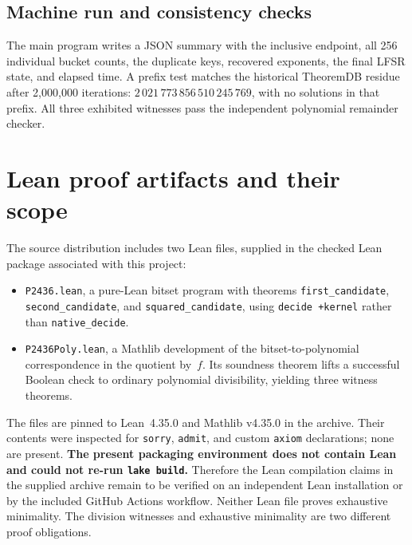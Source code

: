 \documentclass[11pt,a4paper]{article}
\begin{document}
\subsection{Machine run and consistency checks}
The main program writes a JSON summary with the inclusive endpoint,
all 256 individual bucket counts, the duplicate keys, recovered
exponents, the final LFSR state, and elapsed time. A prefix test
matches the historical TheoremDB residue after 2,000,000 iterations:
\(2\,021\,773\,856\,510\,245\,769\), with no solutions in that
prefix. All three exhibited witnesses pass the independent polynomial
remainder checker.

\section{Lean proof artifacts and their scope}
The source distribution includes two Lean files, supplied in the
checked Lean package associated with this project:
\begin{itemize}
\item \texttt{P2436.lean}, a pure-Lean bitset program with theorems
\texttt{first\_candidate}, \texttt{second\_candidate}, and
\texttt{squared\_candidate}, using \texttt{decide +kernel} rather than
\texttt{native\_decide}.
\item \texttt{P2436Poly.lean}, a Mathlib development of the
bitset-to-polynomial correspondence in the quotient by~\(f\). Its
soundness theorem lifts a successful Boolean check to ordinary
polynomial divisibility, yielding three witness theorems.
\end{itemize}
The files are pinned to Lean~4.35.0 and Mathlib v4.35.0 in the archive.
Their contents were inspected for \texttt{sorry}, \texttt{admit}, and
custom \texttt{axiom} declarations; none are present.
\textbf{The present packaging environment does not contain Lean and
could not re-run \texttt{lake build}.} Therefore the Lean compilation
claims in the supplied archive remain to be verified on an independent
Lean installation or by the included GitHub Actions workflow.
Neither Lean file proves exhaustive minimality. The division witnesses
and exhaustive minimality are two different proof obligations.
\end{document}
